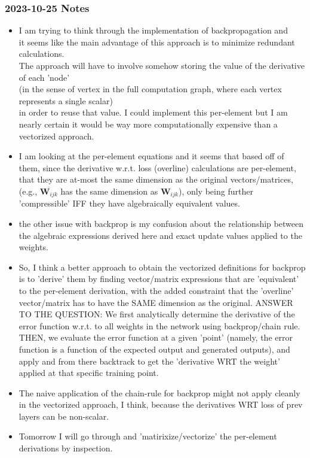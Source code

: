 \documentclass{article}
\begin{document}
\subsubsection{2023-10-25 Notes}
\begin{itemize}
    \item I am trying to think through the implementation of backpropagation and \\
    it seems like the main advantage of this approach is to minimize redundant calculations.\\
    The approach will have to involve somehow storing the value of the derivative of each 'node' \\
    (in the sense of vertex in the full computation graph, where each vertex represents a single scalar) \\
    in order to reuse that value. I could implement this per-element but I am nearly certain it would be way 
    more computationally expensive than a vectorized approach.
    \item I am looking at the per-element equations and it seems that based off of them, 
    since the derivative w.r.t. loss (overline) calculations are per-element, that they are at-most the same
    dimension as the original vectors/matrices, (e.g., $\overline{\bm{W}_{ijk}}$ has the same dimension as $\bm{W}_{ijk}$),
    only being further 'compressible' IFF they have algebraically equivalent values.
    \item the other issue with backprop is my confusion about the relationship between the algebraic expressions derived here and 
    exact update values applied to the weights. 
    \item So, I think a better approach to obtain the vectorized definitions for backprop is to 'derive' them
    by finding vector/matrix expressions that are 'equivalent' to the per-element derivation, with the added constraint 
    that the 'overline' vector/matrix has to have the SAME dimension as the original.
    ANSWER TO THE QUESTION: We first analytically determine the derivative of the error function w.r.t. to all weights in the network using backprop/chain rule.
    THEN, we evaluate the error function at a given 'point' (namely, the error function is a function of the expected output and generated outputs), and apply 
    and from there backtrack to get the 'derivative WRT the weight' applied at that specific training point. 
    \item The naive application of the chain-rule for backprop might not apply cleanly in the vectorized approach, I think,
    because the derivatives WRT loss of prev layers can be non-scalar.
    \item Tomorrow I will go through and 'matirixize/vectorize' the per-element derivations by inspection.

\end{itemize}
\end{document}
